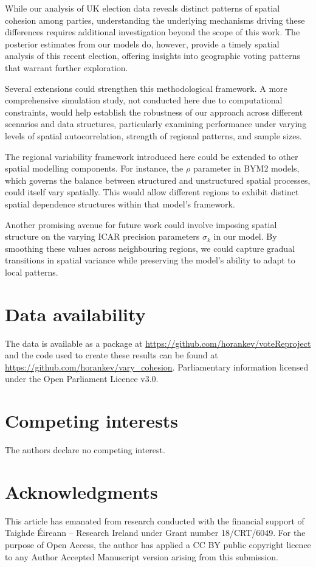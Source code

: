 \documentclass[webpdf,large,contemporary,namedate]{oup-authoring-template}
\theoremstyle{thmstyleone}
\theoremstyle{thmstyletwo}
\theoremstyle{thmstylethree}
\begin{document}
While our analysis of UK election data reveals distinct patterns of
spatial cohesion among parties, understanding the underlying mechanisms
driving these differences requires additional investigation beyond the
scope of this work. The posterior estimates from our models do, however,
provide a timely spatial analysis of this recent election, offering
insights into geographic voting patterns that warrant further
exploration.

Several extensions could strengthen this methodological framework. A
more comprehensive simulation study, not conducted here due to
computational constraints, would help establish the robustness of our
approach across different scenarios and data structures, particularly
examining performance under varying levels of spatial autocorrelation,
strength of regional patterns, and sample sizes.

The regional variability framework introduced here could be extended to
other spatial modelling components. For instance, the \(\rho\) parameter
in BYM2 models, which governs the balance between structured and
unstructured spatial processes, could itself vary spatially. This would
allow different regions to exhibit distinct spatial dependence
structures within that model's framework.

Another promising avenue for future work could involve imposing spatial
structure on the varying ICAR precision parameters \(\sigma_k\) in our
model. By smoothing these values across neighbouring regions, we could
capture gradual transitions in spatial variance while preserving the
model's ability to adapt to local patterns.

\section{Data availability}\label{data-availability}

The data is available as a package at
\url{https://github.com/horankev/voteReproject} and the code used to
create these results can be found at
\url{https://github.com/horankev/vary_cohesion}. Parliamentary
information licensed under the Open Parliament Licence v3.0.

\section{Competing interests}

The authors declare no competing interest.


\section{Acknowledgments}

This article has emanated from research conducted with the financial
support of Taighde Éireann -- Research Ireland under Grant number
18/CRT/6049. For the purpose of Open Access, the author has applied a CC
BY public copyright licence to any Author Accepted Manuscript version
arising from this submission.
\renewcommand\refname{References}




\end{document}
